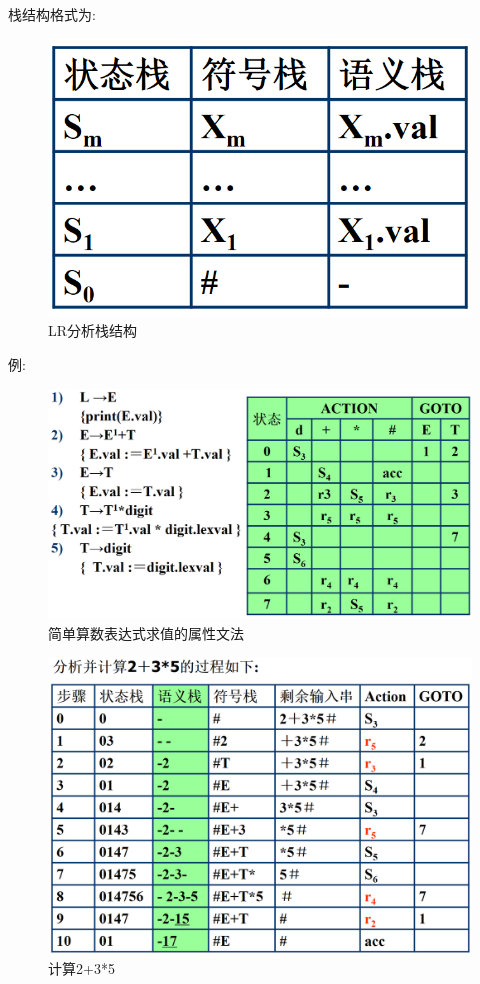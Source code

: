 \documentclass[UTF8,a4paper]{ctexart}
\begin{document}
 栈结构格式为:
 \begin{figure}[H]
  \centering
  \includegraphics[scale = 0.3]{assets/CompilerConstructionPrinciples_c4498.png}
  \caption{LR分析栈结构}
 \end{figure}

 例:
 \begin{figure}[H]
  \centering
  \includegraphics[scale = 0.3]{assets/CompilerConstructionPrinciples_443d1.png}
  \caption{简单算数表达式求值的属性文法}
 \end{figure}

 \begin{figure}[H]
  \centering
  \includegraphics[scale = 0.3]{assets/CompilerConstructionPrinciples_4966b.png}
  \caption{计算2+3*5}
 \end{figure}
\end{document}
